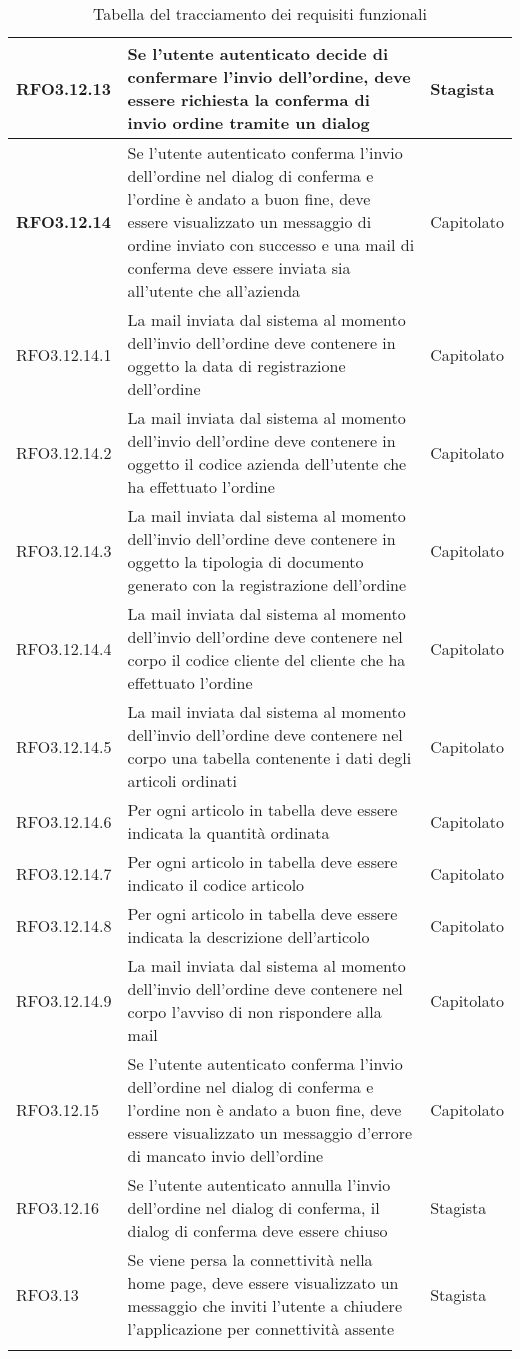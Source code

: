 {\begin{center}
\begin{longtable}{ | >{\centering\arraybackslash}p{2.5cm} | >{\arraybackslash}p{7cm} | >{\centering\arraybackslash}p{2cm} | }
RFO3.12.13 & Se l'utente autenticato decide di confermare l'invio dell'ordine, deve essere richiesta la conferma di invio ordine tramite un dialog & Stagista \\ \hline
\textbf{RFO3.12.14} & Se l'utente autenticato conferma l'invio dell'ordine nel dialog di conferma e l'ordine è andato a buon fine, deve essere visualizzato un messaggio di ordine inviato con successo e una mail di conferma deve essere inviata sia all'utente che all'azienda & Capitolato \\ \hline
RFO3.12.14.1 & La mail inviata dal sistema al momento dell'invio dell'ordine deve contenere in oggetto la data di registrazione dell'ordine & Capitolato \\ \hline
RFO3.12.14.2 & La mail inviata dal sistema al momento dell'invio dell'ordine deve contenere in oggetto il codice azienda dell'utente che ha effettuato l'ordine & Capitolato \\ \hline
RFO3.12.14.3 & La mail inviata dal sistema al momento dell'invio dell'ordine deve contenere in oggetto la tipologia di documento generato con la registrazione dell'ordine & Capitolato \\ \hline
RFO3.12.14.4 & La mail inviata dal sistema al momento dell'invio dell'ordine deve contenere nel corpo il codice cliente del cliente che ha effettuato l'ordine & Capitolato \\ \hline
RFO3.12.14.5 & La mail inviata dal sistema al momento dell'invio dell'ordine deve contenere nel corpo una tabella contenente i dati degli articoli ordinati & Capitolato \\ \hline
RFO3.12.14.6 & Per ogni articolo in tabella deve essere indicata la quantità ordinata & Capitolato \\ \hline
RFO3.12.14.7 & Per ogni articolo in tabella deve essere indicato il codice articolo & Capitolato \\ \hline
RFO3.12.14.8 & Per ogni articolo in tabella deve essere indicata la descrizione dell'articolo & Capitolato \\ \hline
RFO3.12.14.9 & La mail inviata dal sistema al momento dell'invio dell'ordine deve contenere nel corpo l'avviso di non rispondere alla mail & Capitolato \\ \hline
RFO3.12.15 & Se l'utente autenticato conferma l'invio dell'ordine nel dialog di conferma e l'ordine non è andato a buon fine, deve essere visualizzato un messaggio d'errore di mancato invio dell'ordine & Capitolato \\ \hline
RFO3.12.16 & Se l'utente autenticato annulla l'invio dell'ordine nel dialog di conferma, il dialog di conferma deve essere chiuso & Stagista \\ \hline
RFO3.13 & Se viene persa la connettività nella home page, deve essere visualizzato un messaggio che inviti l'utente a chiudere l'applicazione per connettività assente & Stagista \\
\hline
\caption{Tabella del tracciamento dei requisiti funzionali}
\end{longtable}
\end{center}}

